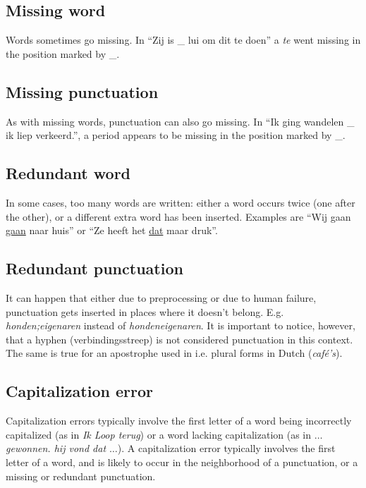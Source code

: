 \documentclass[a4paper,11pt]{article}
\begin{document}
\subsection{Missing word}

Words sometimes go missing. In ``Zij is \_ lui om dit te doen'' a
\emph{te} went missing in the position marked by \_.

\subsection{Missing punctuation}

As with missing words, punctuation can also go missing. In ``Ik ging
wandelen \_ ik liep verkeerd.'', a period appears to be missing in the
position marked by \_.

\subsection{Redundant word}

In some cases, too many words are written: either a word occurs twice
(one after the other), or a different extra word has been inserted.
Examples are ``Wij gaan \underline{gaan} naar huis'' or ``Ze heeft het
\underline{dat} maar druk''. 

\subsection{Redundant punctuation}

It can happen that either due to preprocessing or due to human
failure, punctuation gets inserted in places where it doesn't belong.
E.g. \emph{honden;eigenaren} instead of \emph{hondeneigenaren}. It is
important to notice, however, that a hyphen (verbindingsstreep) is not
considered punctuation in this context. The same is true for an
apostrophe used in i.e.  plural forms in Dutch (\emph{caf\'e's}).

\subsection{Capitalization error}

Capitalization errors typically involve the first letter of a word
being incorrectly capitalized (as in {\em Ik Loop terug}) or a word
lacking capitalization (as in {\em $\ldots$ gewonnen. hij vond dat
  $\ldots$}). A capitalization error typically involves the first
letter of a word, and is likely to occur in the neighborhood of a
punctuation, or a missing or redundant punctuation.
\end{document}
